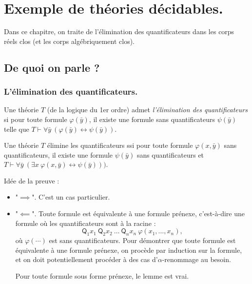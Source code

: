 \documentclass[./main]{subfiles}
\begin{document}
  \chapter{Exemple de théories décidables.}

  Dans ce chapitre, on traite de l'élimination des quantificateurs dans les corps réels clos (et les corps algébriquement clos).

  \section{De quoi on parle ?}
  \subsection{L'élimination des quantificateurs.}



  \begin{defn}
    Une théorie $T$ (de la logique du 1er ordre) admet \textit{l'élimination des quantificateurs} si pour toute formule $\varphi(\bar{y})$, il existe une formule sans quantificateurs $\psi(\bar{y})$ telle que $T \vdash \forall \bar{y} \: (\varphi(\bar{y}) \leftrightarrow \psi(\bar{y}))$.
  \end{defn}

  \begin{lem}
    Une théorie $T$ élimine les quantificateurs ssi pour toute formule $\varphi(x, \bar{y})$ sans quantificateurs, il existe une formule $\psi(\bar{y})$ sans quantificateurs et $T \vdash \forall \bar{y}\: (\exists x \: \varphi(x, \bar{y}) \leftrightarrow \psi(\bar{y})))$.
  \end{lem}
  \begin{prv}
    Idée de la preuve :
    \begin{itemize}
      \item "$\implies$". C'est un cas particulier.
      \item "$\impliedby$".
        Toute formule est équivalente à une formule prénexe, c'est-à-dire une formule où les quantificateurs sont à la racine :
        \[
        \mathsf{Q}_1 x_1 \: \mathsf{Q}_2 x_2 \:\ldots \: \mathsf{Q}_n x_n \: \varphi(x_1, \ldots, x_n)
        ,\] 
        où $\varphi(\cdots)$ est sans quantificateurs.
        Pour démontrer que toute formule est équivalente à une formule prénexe, on procède par induction sur la formule, et on doit potentiellement procéder à des cas d'$\alpha$-renommage au besoin.


        Pour toute formule sous forme prénexe, le lemme est vrai.
    \end{itemize}
  \end{prv}
\end{document}
